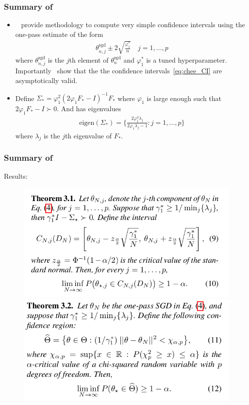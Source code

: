 \documentclass{beamer}
\newcommand{\exsgd}{\theta^{\text{sgd}}}
\begin{document}
\begin{frame}
  \frametitle{Summary of~\citet{chee:2023}}
  \begin{itemize}
  \item ~\citet{chee:2023} provide methodology to compute very simple confidence intervals using the one-pass estimate of the form
  \begin{align}
    \exsgd_{n,j} \pm 2\sqrt{\frac{\varphi_1^*}{n}} \quad j=1,\dots,p \label{eq:chee_CI}
  \end{align}
  where $\exsgd_{n,j}$ is the $j$th element of $\exsgd_n$ and $\varphi_1^*$ is a tuned hyperparameter. Importantly~\citet[][Theorems 3.1, 3.2]{chee:2023} show that the the confidence intervals~\eqref{eq:chee_CI} are asymptotically valid.
\item Define $\Sigma_* = \varphi_1^2 {(2 \varphi_1 F_* - I)}^{-1} F_*$ where $\varphi_1$ is large enough such that $2\varphi_1 F_* - I \succ 0$. And has eigenvalues
  \begin{align*}
    \text{eigen}(\Sigma_*) = \{\frac{2\varphi_1^2 \lambda_j}{2\varphi_1\lambda_j - 1} : j=1,\dots,p\}
  \end{align*}
  where $\lambda_j$ is the $j$th eigenvalue of $F_*$.
  \end{itemize}
\end{frame}

\begin{frame}
  \frametitle{Summary of~\citet{chee:2023}}
  Results:
  \begin{figure}[h!]
    \centering
    \includegraphics[scale=0.25]{31.png}
    \includegraphics[scale=0.25]{32.png}
  \end{figure}
\end{frame}
\end{document}
